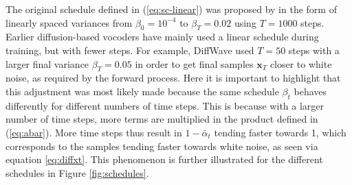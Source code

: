 \documentclass{report}
\begin{document}
The original schedule defined in (\ref{eq:sc-linear}) was proposed by \cite{ho2020denoising} in the form of linearly spaced variances from $\beta_0 = 10^{-4}$ to $\beta_T=0.02$ using $T=1000$ steps. Earlier diffusion-based vocoders have mainly used a linear schedule during training, but with fewer steps. For example, DiffWave used $T=50$ steps with a larger final variance $\beta_T=0.05$ in order to get final samples $\bm{x}_T$ closer to white noise, as required by the forward process. Here it is important to highlight that this adjustment was most likely made because the same schedule $\beta_t$ behaves differently for different numbers of time steps. This is because with a larger number of time steps, more terms are multiplied in the product defined in (\ref{eq:abar}). More time steps thus result in $1-\bar{\alpha}_t$ tending faster towards 1, which corresponds to the samples tending faster towards white noise, as seen via equation \ref{eq:diffxt}. This phenomenon is further illustrated for the different schedules in Figure \ref{fig:schedules}.
\end{document}
